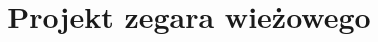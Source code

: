 \documentclass[a4paper]{report}
\title{Projekt zegara wieżowego}
\begin{document}
    \placeTitlePage
    \tableofcontents
    
    
  
\end{document}
